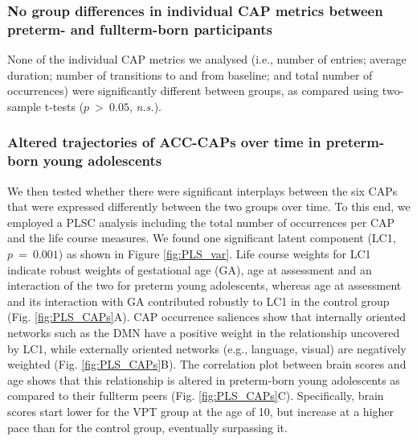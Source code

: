 \subsubsection*{No group differences in individual CAP metrics between preterm- and fullterm-born participants} None of the individual CAP metrics we analysed (i.e.,  number of entries; average duration; number of transitions to and from baseline; and total number of occurrences) were significantly different between groups, as compared using two-sample t-tests ($p~>~0.05$, \textit{n.s.}). 

\subsubsection*{Altered trajectories of ACC-CAPs over time in preterm-born young adolescents} We then tested whether there were significant interplays between the six CAPs that were expressed differently between the two groups over time. To this end, we employed a PLSC analysis including the total number of occurrences per CAP and the life course measures. We found one significant latent component (LC1, $p~=~0.001$) as shown in Figure \ref{fig:PLS_var}. Life course weights for LC1  indicate robust weights of gestational age (GA), age at assessment and an interaction of the two for preterm young adolescents, whereas age at assessment and its interaction with GA contributed robustly to LC1 in the control group (Fig. \ref{fig:PLS_CAPs}A). CAP occurrence saliences show that internally oriented networks such as the DMN have a positive weight in the relationship uncovered by LC1, while externally oriented networks (e.g., language, visual) are negatively weighted (Fig. \ref{fig:PLS_CAPs}B). The correlation plot between brain scores and age shows that this relationship is altered in preterm-born young adolescents as compared to their fullterm peers (Fig. \ref{fig:PLS_CAPs}C). Specifically, brain scores start lower for the VPT group at the age of 10, but increase at a higher pace than for the control group, eventually surpassing it. 




